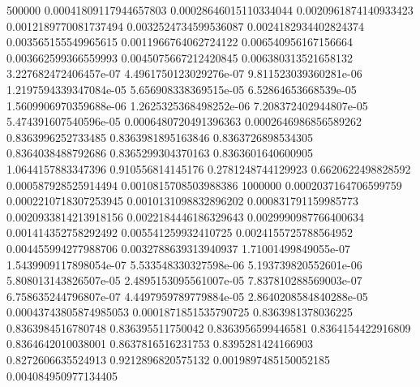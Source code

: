 {500000 0.00041809117944657803 0.00028646015110334044 0.0020961874140933423 0.0012189770081737494 0.0032524734599536087 0.0024182934402824374 0.003565155549965615 0.0011966764062724122 0.006540956167156664 0.003662599366559993 0.0045075667212420845 0.006380313521658132 3.227682472406457e-07 4.4961750123029276e-07 9.811523039360281e-06 1.2197594339347084e-05 5.656908338369515e-05 6.52864653668539e-05 1.5609906970359688e-06 1.2625325368498252e-06 7.208372402944807e-05 5.474391607540596e-05 0.0006480720491396363 0.0002646986856589262 0.8363996252733485 0.8363981895163846 0.8363726898534305 0.8364038488792686 0.8365299304370163 0.8363601640600905 1.0644157883347396 0.910556814145176 0.2781248744129923 0.6620622498828592 0.000587928525914494 0.0010815708503988386
1000000 0.0002037164706599759 0.0002210718307253945 0.0010131098832896202 0.000831791159985773 0.0020933814213918156 0.0022184446186329643 0.0029990987766400634 0.001414352758292492 0.005541259932410725 0.0024155725788564952 0.004455994277988706 0.0032788639313940937 1.71001499849055e-07 1.5439909117898054e-07 5.533548330327598e-06 5.193739820552601e-06 5.808013143826507e-05 2.4895153095561007e-05 7.837810288569003e-07 6.758635244796807e-07 4.4497959789779884e-05 2.8640208584840288e-05 0.00043743805874985053 0.0001871851535790725 0.8363981378036225 0.8363984516780748 0.836395511750042 0.8363956599446581 0.8364154422916809 0.8364642010038001 0.8637816516231753 0.8395281424166903 0.8272606635524913 0.9212896820575132 0.0019897485150052185 0.004084950977134405
}\dataA

